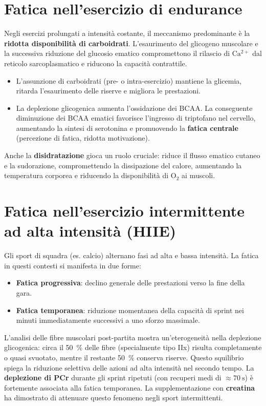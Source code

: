 \documentclass[12pt,a4paper]{report}
\begin{document}
\section{Fatica nell'esercizio di endurance}
Negli esercizi prolungati a intensità costante, il meccanismo predominante è la \textbf{ridotta disponibilità di carboidrati}. L'esaurimento del glicogeno muscolare e la successiva riduzione del glucosio ematico compromettono il rilascio di \(\mathrm{Ca^{2+}}\) dal reticolo sarcoplasmatico e riducono la capacità contrattile.
\begin{itemize}
\item L'assunzione di carboidrati (pre- o intra-esercizio) mantiene la glicemia, ritarda l'esaurimento delle riserve e migliora le prestazioni.
\item La deplezione glicogenica aumenta l'ossidazione dei BCAA. La conseguente diminuzione dei BCAA ematici favorisce l'ingresso di triptofano nel cervello, aumentando la sintesi di serotonina e promuovendo la \textbf{fatica centrale} (percezione di fatica, ridotta motivazione).
\end{itemize}
Anche la \textbf{disidratazione} gioca un ruolo cruciale: riduce il flusso ematico cutaneo e la sudorazione, compromettendo la dissipazione del calore, aumentando la temperatura corporea e riducendo la disponibilità di \(\mathrm{O_2}\) ai muscoli.

\section{Fatica nell'esercizio intermittente ad alta intensità (HIIE)}
Gli sport di squadra (es. calcio) alternano fasi ad alta e bassa intensità. La fatica in questi contesti si manifesta in due forme:
\begin{itemize}
\item \textbf{Fatica progressiva}: declino generale delle prestazioni verso la fine della gara.
\item \textbf{Fatica temporanea}: riduzione momentanea della capacità di sprint nei minuti immediatamente successivi a uno sforzo massimale.
\end{itemize}
L'analisi delle fibre muscolari post-partita mostra un'eterogeneità nella deplezione glicogenica: circa il \SI{50}{\percent} delle fibre (specialmente tipo IIx) risulta completamente o quasi svuotato, mentre il restante \SI{50}{\percent} conserva riserve. Questo squilibrio spiega la riduzione selettiva delle azioni ad alta intensità nel secondo tempo.
La \textbf{deplezione di PCr} durante gli sprint ripetuti (con recuperi medi di \(\approx \SI{70}{\second}\)) è fortemente associata alla fatica temporanea. La supplementazione con \textbf{creatina} ha dimostrato di attenuare questo fenomeno negli sport intermittenti.
\end{document}
